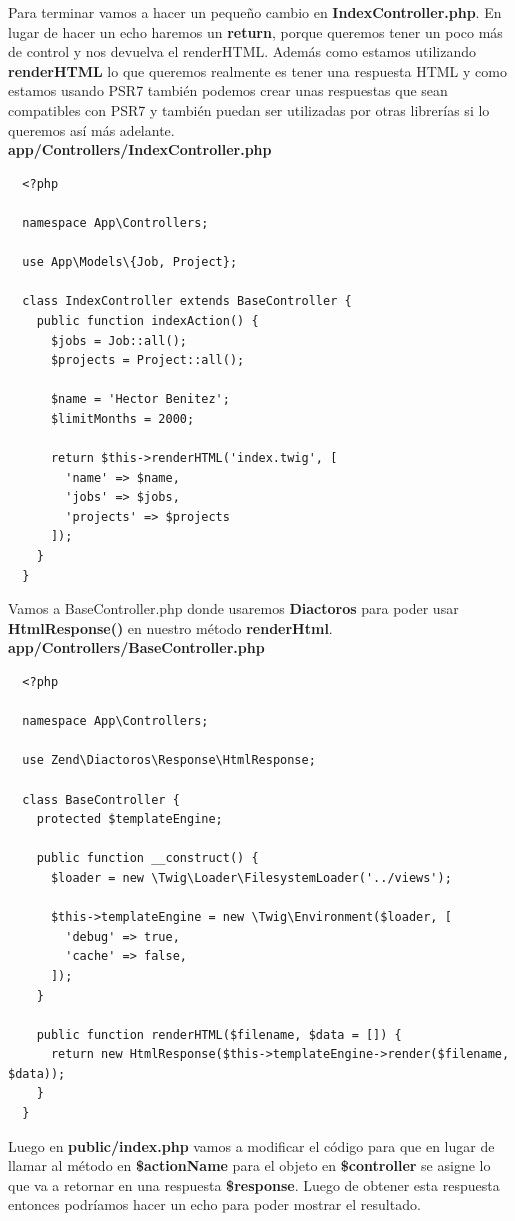 \documentclass{article}
\begin{document}
Para terminar vamos a hacer un pequeño cambio en \textbf{IndexController.php}.
En lugar de hacer un echo haremos un \textbf{return}, porque queremos tener un
poco más de control y nos devuelva el renderHTML. Además como estamos
utilizando \textbf{renderHTML} lo que queremos realmente es tener una respuesta
HTML y como estamos usando PSR7 también podemos crear unas respuestas que sean
compatibles con PSR7 y también puedan ser utilizadas por otras librerías si lo
queremos así más adelante.\\

\textbf{app/Controllers/IndexController.php}
\begin{verbatim}
  <?php

  namespace App\Controllers;

  use App\Models\{Job, Project};

  class IndexController extends BaseController {
    public function indexAction() {
      $jobs = Job::all();
      $projects = Project::all();

      $name = 'Hector Benitez';
      $limitMonths = 2000;

      return $this->renderHTML('index.twig', [
        'name' => $name,
        'jobs' => $jobs,
        'projects' => $projects
      ]);
    }
  }
\end{verbatim}

Vamos a BaseController.php donde usaremos \textbf{Diactoros} para poder usar
\textbf{HtmlResponse()} en nuestro método \textbf{renderHtml}.\\

\textbf{app/Controllers/BaseController.php}
\begin{verbatim}
  <?php

  namespace App\Controllers;

  use Zend\Diactoros\Response\HtmlResponse;

  class BaseController {
    protected $templateEngine;

    public function __construct() {
      $loader = new \Twig\Loader\FilesystemLoader('../views');

      $this->templateEngine = new \Twig\Environment($loader, [
        'debug' => true,
        'cache' => false,
      ]);
    }

    public function renderHTML($filename, $data = []) {
      return new HtmlResponse($this->templateEngine->render($filename, $data));
    }
  }
\end{verbatim}

Luego en \textbf{public/index.php} vamos a modificar el código para que en
lugar de llamar al método en \textbf{\$actionName} para el objeto en
\textbf{\$controller} se asigne lo que va a retornar en una respuesta
\textbf{\$response}. Luego de obtener esta respuesta entonces podríamos hacer un
echo para poder mostrar el resultado.\\
\end{document}
